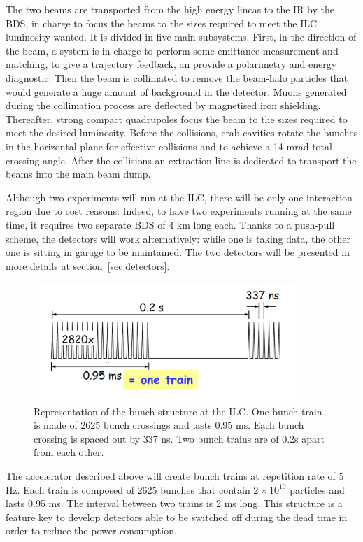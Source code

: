     The two beams are transported from the high energy lincas to the \gls{IR} by the \gls{BDS}, in charge to focus the beams to the sizes required to meet the \gls{ILC} luminosity wanted.
    It is divided in five main subsystems. 
    First, in the direction of the beam, a system is in charge to perform some emittance measurement and matching, to give a trajectory feedback, an provide a polarimetry and energy diagnostic. 
    Then the beam is collimated to remove the beam-halo particles that would generate a huge amount of background in the detector.
    Muons generated during the collimation process are deflected by magnetised iron shielding.
    Thereafter, strong compact quadrupoles focus the beam to the sizes required to meet the desired luminosity. 
    Before the collisions, crab cavities rotate the bunches in the horizontal plane for effective collisions and to achieve a 14 mrad total crossing angle.
    After the collisions an extraction line is dedicated to transport the beams into the main beam dump.

    Although two experiments will run at the \gls{ILC}, there will be only one interaction region due to cost reasons.
    Indeed, to have two experiments running at the same time, it requires two separate \gls{BDS} of 4 km long each.
    Thanks to a push-pull scheme, the detectors will work alternatively: while one is taking data, the other one is sitting in garage to be maintained.
    The two detectors will be presented in more details at section~\ref{sec:detectors}.
    
    \begin{figure}[!h]
      \centering
      \includegraphics[width = 10cm]{Pictures/ILC/bunch.png}
      \caption{Representation of the bunch structure at the ILC. One bunch train is made of 2625 bunch crossings and lasts 0.95 ms. Each bunch crossing is spaced out by 337 ns. Two bunch trains are of 0.2s apart from each other.}
      \label{fig:bunches}
    \end{figure}

    The accelerator described above will create bunch trains at repetition rate of 5 Hz. 
    Each train is composed of 2625 bunches that contain $2\times 10^{10}$ particles and lasts 0.95 ms. 
    The interval between two trains is 2 ms long. 
    This structure is a feature key to develop detectors able to be switched off during the dead time in order to reduce the power consumption.

